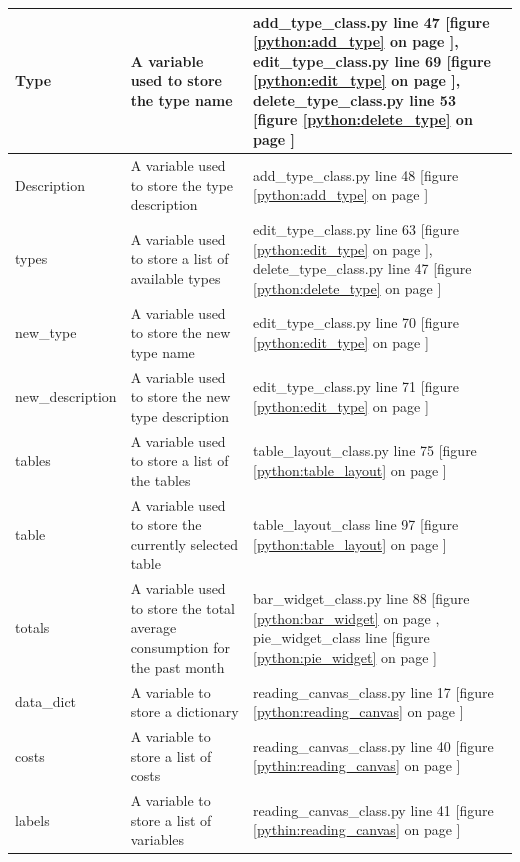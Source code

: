 \begin{center}
	\begin{tabular}{|p{4cm}|p{4.5cm}|p{4.5cm}|}
	\hline
	Type & A variable used to store the type name & add\_type\_class.py line 47 [figure \ref{python:add_type} on page \pageref{python:add_type}], edit\_type\_class.py line 69 [figure \ref{python:edit_type} on page \pageref{python:edit_type}], delete\_type\_class.py line 53 [figure \ref{python:delete_type} on page \pageref{python:delete_type}] \\ \hline
	Description & A variable used to store the type description & add\_type\_class.py line 48 [figure \ref{python:add_type} on page \pageref{python:add_type}] \\ \hline
	types & A variable used to store a list of available types & edit\_type\_class.py line 63 [figure \ref{python:edit_type} on page \pageref{python:edit_type}], delete\_type\_class.py line 47 [figure \ref{python:delete_type} on page \pageref{python:delete_type}] \\ \hline
	new\_type & A variable used to store the new type name & edit\_type\_class.py line 70 [figure \ref{python:edit_type} on page \pageref{python:edit_type}] \\ \hline
	new\_description & A variable used to store the new type description & edit\_type\_class.py line 71 [figure \ref{python:edit_type} on page \pageref{python:edit_type}] \\ \hline
	tables & A variable used to store a list of the tables & table\_layout\_class.py line 75 [figure \ref{python:table_layout} on page \pageref{python:table_layout}] \\ \hline
	table & A variable used to store the currently selected table & table\_layout\_class line 97 [figure \ref{python:table_layout} on page \pageref{python:table_layout}] \\ \hline
	totals & A variable used to store the total average consumption for the past month & bar\_widget\_class.py line 88 [figure \ref{python:bar_widget} on page \pageref{python:bar_widget}, pie\_widget\_class line [figure \ref{python:pie_widget} on page \pageref{python:pie_widget}] \\ \hline
	data\_dict & A variable to store a dictionary & reading\_canvas\_class.py line 17 [figure \ref{python:reading_canvas} on page \pageref{python:reading_canvas}] \\ \hline
	costs & A variable to store a list of costs & reading\_canvas\_class.py line 40 [figure \ref{pythin:reading_canvas} on page \pageref{python:reading_canvas}] \\ \hline
	labels & A variable to store a list of variables & reading\_canvas\_class.py line 41 [figure \ref{pythin:reading_canvas} on page \pageref{python:reading_canvas}] \\ \hline
	\end{tabular}
\end{center}

